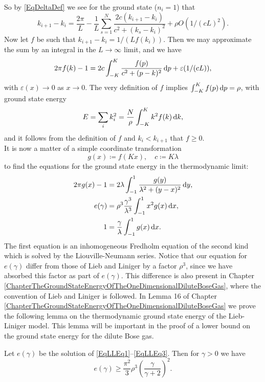 So by \eqref{EqDeltaDef} we see for the ground state ($ n_i=1 $) that \begin{equation}\label{EqPseudoMomentaDifferenceExpansion}
k_{i+1}-k_i=\frac{2\pi}{L}-\frac{1}{L}\sum_{s=1}^{N}\frac{2c(k_{i+1}-k_i)}{c^2+(k_s-k_i)^2}+\rho O(1/(cL)^2).
\end{equation}
Now let $ f $ be such that $ k_{i+1}-k_i=1/(Lf(k_i)) $. Then we may approximate the sum by an integral in the $L\to\infty$ limit, and we have \begin{equation}
2\pi f(k)-1=2c\int_{-K}^{K}\frac{f(p)}{c^2+(p-k)^2}\mathop{}\!\mathrm{d} p+\varepsilon(1/(cL)),
\end{equation}
with $\varepsilon(x)\to 0$ as $ x\to 0 $.
The very definition of $ f $ implies $ \int_{-K}^{K}f(p)\mathop{}\!\mathrm{d} p=\rho $, with ground state energy\begin{equation}
E=\sum_{i}k_i^2=\frac{N}{\rho}\int_{-K}^{K}k^2f(k)\mathop{}\!\mathrm{d} k,
\end{equation} 
and it follows from the definition of $ f $ and $ k_i<k_{i+1} $ that $ f\geq 0 $.\\
It is now a matter of a simple coordinate transformation\begin{equation}
g(x)\coloneqq f(Kx),\quad  c\coloneqq K\lambda
\end{equation}
to find the equations for the ground state energy in the thermodynamic limit:
\begin{align}
2\pi g(x)-1&=2\lambda\int_{-1}^{1}\frac{g(y)}{\lambda^2+(y-x)^2}\mathop{}\!\mathrm{d} y\label{EqLLEq1},\\
e(\gamma)&=\rho^3\frac{\gamma^3}{\lambda^3}\int_{-1}^{1}x^2 g(x)\mathop{}\!\mathrm{d} x\label{EqLLEq2},\\
1&=\frac{\gamma}{\lambda}\int_{-1}^{1}g(x)\mathop{}\!\mathrm{d} x.\label{EqLLEq3}
\end{align}
The first equation is an inhomogeneous Fredholm equation of the second kind which is solved by the Liouville-Neumann series. Notice that our equation for  $ e(\gamma) $ differ from those of Lieb and Liniger by a factor $ \rho^3 $, since we have absorbed this factor as part of $ e(\gamma) $. This difference is also present in Chapter \ref{ChapterTheGroundStateEnergyOfTheOneDimensionalDiluteBoseGas}, where the convention of Lieb and Liniger is followed. In Lemma 16 of Chapter \ref{ChapterTheGroundStateEnergyOfTheOneDimensionalDiluteBoseGas} we prove the following lemma on the thermodynamic ground state energy of the Lieb-Liniger model. This lemma will be important in the proof of a lower bound on the ground state energy for the dilute Bose gas.
\begin{lemma}
	Let $ e(\gamma) $ be the solution of \eqref{EqLLEq1}--\eqref{EqLLEq3}. Then for $ \gamma>0 $ we have \begin{equation}
	e(\gamma)\geq \frac{\pi^2}{3}\rho^3\left(\frac{\gamma}{\gamma+2}\right)^2.
	\end{equation}
\end{lemma}
